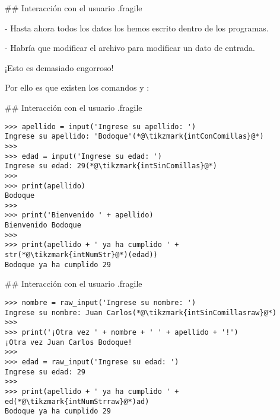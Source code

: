 ## Interacción con el usuario {.fragile}

- Hasta ahora todos los datos los hemos escrito dentro de los programas.

- Habría que modificar el archivo  para modificar un dato de entrada.

\vfill

\bgnblockalert
¡Esto es demasiado engorroso!
\trmblockalert

\vfill
\pause

\bgnblockidea
Por ello es que existen los comandos\newline{} y :
\trmblockidea

## Interacción con el usuario {.fragile}

\begin{lstlisting}
>>> apellido = input('Ingrese su apellido: ')
Ingrese su apellido: 'Bodoque'(*@\tikzmark{intConComillas}@*)
>>>
>>> edad = input('Ingrese su edad: ')
Ingrese su edad: 29(*@\tikzmark{intSinComillas}@*)
>>>
>>> print(apellido)
Bodoque
>>>
>>> print('Bienvenido ' + apellido)
Bienvenido Bodoque
>>>
>>> print(apellido + ' ya ha cumplido ' + str(*@\tikzmark{intNumStr}@*)(edad))
Bodoque ya ha cumplido 29
\end{lstlisting}


## Interacción con el usuario {.fragile}

\begin{lstlisting}
>>> nombre = raw_input('Ingrese su nombre: ')
Ingrese su nombre: Juan Carlos(*@\tikzmark{intSinComillasraw}@*)
>>>
>>> print('¡Otra vez ' + nombre + ' ' + apellido + '!')
¡Otra vez Juan Carlos Bodoque!
>>>
>>> edad = raw_input('Ingrese su edad: ')
Ingrese su edad: 29
>>>
>>> print(apellido + ' ya ha cumplido ' + ed(*@\tikzmark{intNumStrraw}@*)ad)
Bodoque ya ha cumplido 29

\end{lstlisting}


